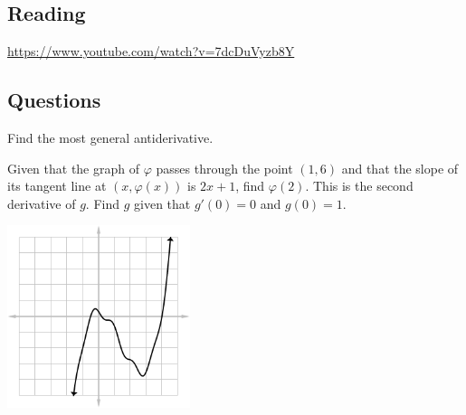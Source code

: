 


\subsection*{Reading}
\begin{center}
\begin{tcolorbox}[width=0.8\textwidth,colback={red},title={\textbf{Go and watch...}},colbacktitle=yellow,coltitle=blue]
  \textcolor{white}{\url{https://www.youtube.com/watch?v=7dcDuVyzb8Y}}
\end{tcolorbox}
\end{center}

\subsection*{Questions}
\begin{questions}
  \question Find the most general antiderivative.
  \question Given that the graph of $ \varphi $ passes through the point $ (1, 6) $
            and that the slope of its tangent line at $ (x, \varphi(x)) $ is $ 2x + 1 $,
            find $ \varphi(2) $.
  \question This is the second derivative of $ g $. Find $ g $ given that $ g'(0) = 0 $ and $ g(0) = 1 $.
            \begin{center}
              \includegraphics[width=0.4\textwidth]{anti7}
            \end{center}
\end{questions}


